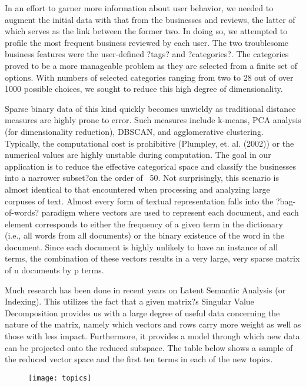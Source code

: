 \quad In an effort to garner more information about user behavior, we needed to augment the initial data with that from the businesses and reviews, the latter of which serves as the link between the former two. In doing so, we attempted to profile the most frequent business reviewed by each user. The two troublesome business features were the user-defined ?tags? and ?categories?. The categories proved to be a more manageable problem as they are selected from a finite set of options. With numbers of selected categories ranging from two to 28 out of over 1000 possible choices, we sought to reduce this high degree of dimensionality.

\quad Sparse binary data of this kind quickly becomes unwieldy as traditional distance measures are highly prone to error. Such measures include k-means, PCA analysis (for dimensionality reduction), DBSCAN, and agglomerative clustering. Typically, the computational cost is prohibitive (Plumpley, et. al. (2002)) or the numerical values are highly unstable during computation. The goal in our application is to reduce the effective categorical space and classify the businesses into a narrower subset?on the order of ~50. Not surprisingly, this scenario is almost identical to that encountered when processing and analyzing large corpuses of text. Almost every form of textual representation falls into the ?bag-of-words? paradigm where vectors are used to represent each document, and each element corresponds to either the frequency of a given term in the dictionary (i.e., all words from all documents) or the binary existence of the word in the document. Since each document is highly unlikely to have an instance of all terms, the combination of these vectors results in a very large, very sparse matrix of n documents by p terms.

\quad Much research has been done in recent years on Latent Semantic Analysis (or Indexing). This utilizes the fact that a given matrix?s Singular Value Decomposition provides us with a large degree of useful data concerning the nature of the matrix, namely which vectors and rows carry more weight as well as those with less impact. Furthermore, it provides a model through which new data can be projected onto the reduced subspace. The table below shows a sample of the reduced vector space and the first ten terms in each of the new topics.

\begin{figure}[!h]
\texttt{[image: topics]}
\end{figure}

